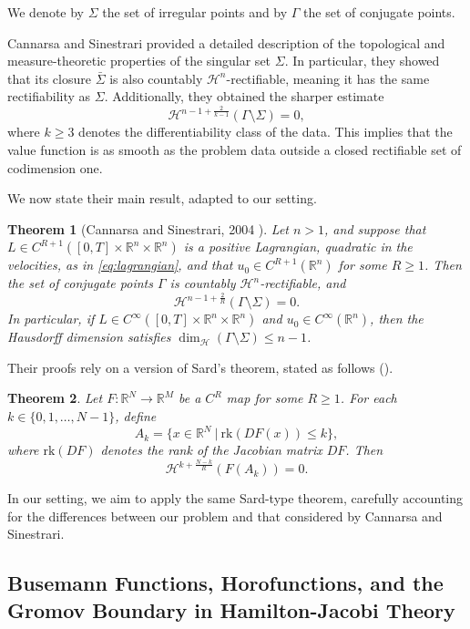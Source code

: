 \documentclass[a4paper,10pt]{amsart}
\theoremstyle{plain}
\newtheorem{thm}{Theorem}
\theoremstyle{definition}
\numberwithin{equation}{section}
\numberwithin{thm}{section}
\begin{document}
We denote by $\Sigma$ the set of irregular points and by $\Gamma$ the set of conjugate points.

Cannarsa and Sinestrari provided a detailed description of the topological and measure-theoretic properties of the singular set $\Sigma$. In particular, they showed that its closure $\bar{\Sigma}$ is also countably $\mathcal{H}^n$-rectifiable, meaning it has the same rectifiability as $\Sigma$. Additionally, they obtained the sharper estimate
\[
\mathcal{H}^{n-1+\frac{2}{k-1}}(\Gamma\setminus\Sigma) = 0,
\]
where $k \geq 3$ denotes the differentiability class of the data. This implies that the value function is as smooth as the problem data outside a closed rectifiable set of codimension one.

We now state their main result, adapted to our setting.

\begin{thm}[Cannarsa and Sinestrari, 2004 \cite{MR2041617}]\label{thm:CS_6.6.4}
    Let $n > 1$, and suppose that $L \in C^{R+1}([0,T]\times\mathbb{R}^n \times\mathbb{R}^n)$ is a positive Lagrangian, quadratic in the velocities, as in \eqref{eq:lagrangian}, and that $u_0 \in C^{R+1}(\mathbb{R}^n)$ for some $R \geq 1$. Then the set of conjugate points $\Gamma$ is countably $\mathcal{H}^n$-rectifiable, and
    \[
    \mathcal{H}^{n-1+\frac{2}{R}}(\Gamma\setminus\Sigma)=0.
    \]
    In particular, if $L \in C^\infty([0,T]\times\mathbb{R}^n\times\mathbb{R}^n)$ and $u_0 \in C^\infty(\mathbb{R}^n)$, then the Hausdorff dimension satisfies $\dim_{\mathcal{H}}(\Gamma\setminus\Sigma)\leq n-1$.
\end{thm}

Their proofs rely on a version of Sard's theorem, stated as follows (\cite[Theorem 3.4.3]{Federer}).

\begin{thm}\label{thm:CS_Sard}
    Let $F:\mathbb{R}^N\rightarrow\mathbb{R}^M$ be a $C^R$ map for some $R \geq 1$. For each $k \in \{0,1,\dots,N-1\}$, define
    \[
    A_k = \{x\in\mathbb{R}^N\ |\ \mathrm{rk}(DF(x))\leq k\},
    \]
    where $\mathrm{rk}(DF)$ denotes the rank of the Jacobian matrix $DF$. Then
    \[
    \mathcal{H}^{k + \frac{N-k}{R}}(F(A_k)) = 0.
    \]
\end{thm}

In our setting, we aim to apply the same Sard-type theorem, carefully accounting for the differences between our problem and that considered by Cannarsa and Sinestrari.


\subsection{Busemann Functions, Horofunctions, and the Gromov Boundary in Hamilton-Jacobi Theory}
\end{document}
